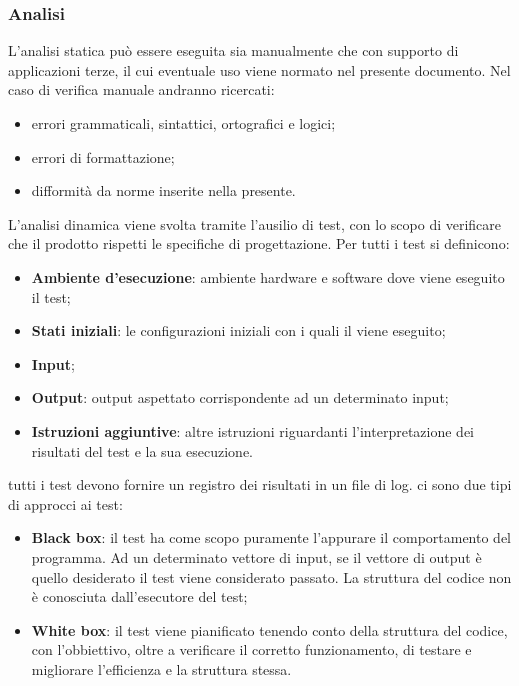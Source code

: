 	\subsubsection{Analisi}
	L'analisi statica può essere eseguita sia manualmente che con supporto di applicazioni terze, il cui eventuale uso viene normato nel presente documento. Nel caso di verifica manuale andranno ricercati:
	\begin{itemize}
	    \item errori grammaticali, sintattici, ortografici e logici;
	    \item errori di formattazione;
	    \item difformità da norme inserite nella presente.
	\end{itemize}
	L'analisi dinamica viene svolta tramite l'ausilio di test, con lo scopo di verificare che il prodotto rispetti le specifiche di progettazione.
	Per tutti i test si definicono:
	\begin{itemize}
	    \item \textbf{Ambiente d'esecuzione}: ambiente hardware e software dove viene eseguito il test;
	    \item \textbf{Stati iniziali}: le configurazioni iniziali con i quali il viene eseguito;
	    \item \textbf{Input};
	    \item \textbf{Output}: output aspettato corrispondente ad un determinato input;
	    \item \textbf{Istruzioni aggiuntive}: altre istruzioni riguardanti l'interpretazione dei risultati del test e la sua esecuzione.
	\end{itemize}
	tutti i test devono fornire un registro dei risultati in un file di log.
	ci sono due tipi di approcci ai test:
	\begin{itemize}
	    \item \textbf{Black box}: il test ha come scopo puramente l'appurare il comportamento del programma. Ad un determinato vettore di input, se il vettore di output è quello desiderato il test viene considerato passato. La struttura del codice non è conosciuta dall'esecutore del test; 
	    \item \textbf{White box}: il test viene pianificato tenendo conto della struttura del codice, con l'obbiettivo, oltre a verificare il corretto funzionamento, di testare e migliorare l'efficienza e la struttura stessa. 
	\end{itemize}
